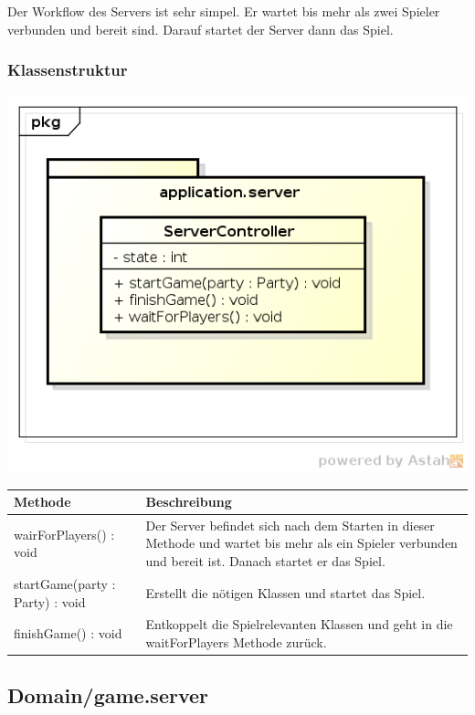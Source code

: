 \documentclass[11pt]{scrartcl}
\begin{document}
Der Workflow des Servers ist sehr simpel. Er wartet bis mehr als zwei Spieler verbunden und bereit sind. Darauf startet der Server dann das Spiel.

\subsubsection{Klassenstruktur}
\includegraphics[scale=0.75]{ClassDiagramApplicationServer}

\begin{tabularx}{\linewidth}{l p{9cm}}
\textbf{Methode} & \textbf{Beschreibung}\\
\hline
wairForPlayers() : void & Der Server befindet sich nach dem Starten in dieser Methode und wartet bis mehr als ein Spieler verbunden und bereit ist. Danach startet er das Spiel.\\
startGame(party : Party) : void & Erstellt die nötigen Klassen und startet das Spiel.\\
finishGame() : void & Entkoppelt die Spielrelevanten Klassen und geht in die waitForPlayers Methode zurück.\\
\end{tabularx}

\newpage

\subsection{Domain/game.server}
\end{document}
